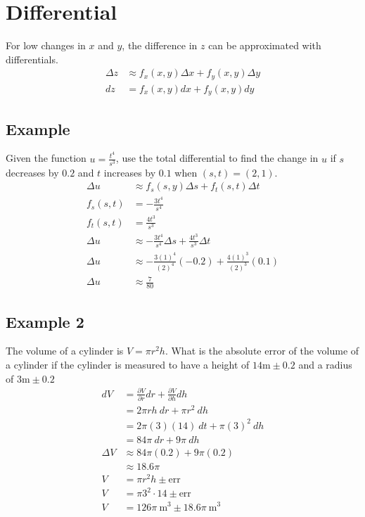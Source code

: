 \documentclass{article}
\theoremstyle{mytheoremstyle}
\theoremstyle{mytheoremstyle}
\theoremstyle{myproblemstyle}
\begin{document}
    \section*{Differential}
    For low changes in $x$ and $y$, the difference in $z$ can be approximated
    with differentials.
    \begin{align*}
        \Delta z &\approx f_x(x,y)\Delta x + f_y(x,y)\Delta y \\
        dz &= f_x(x,y)dx + f_y(x,y)dy
    \end{align*}

    \subsection*{Example}
    Given the function $u=\frac{t^4}{s^3}$, use the total differential to find
    the change in $u$ if $s$ decreases by $0.2$ and $t$ increases by $0.1$ when
    $(s,t)=(2,1)$.
    \begin{align*}
        \Delta u &\approx f_s(s,y) \Delta s + f_t(s,t) \Delta t \\
        f_s(s,t) &= -\frac{3t^4}{s^4} \\
        f_t(s,t) &= \frac{4t^3}{s^3} \\
        \Delta u &\approx -\frac{3t^4}{s^4} \Delta s + \frac{4t^3}{s^3} \Delta t \\
        \Delta u &\approx -\frac{3(1)^4}{(2)^4} (-0.2) + \frac{4(1)^3}{(2)^3} (0.1) \\
        \Delta u &\approx \frac{7}{80}
    \end{align*}

    \subsection*{Example 2}
    The volume of a cylinder is $V=\pi r^2h$. What is the absolute error of
    the volume of a cylinder if the cylinder is measured to have a height of
    $14\text{m}\pm0.2$ and a radius of $3\text{m}\pm0.2$
    \begin{align*}
        dV &= \frac{\partial V}{\partial r} dr + \frac{\partial V}{\partial h} dh \\
           &= 2\pi rh\ dr + \pi r^2\ dh \\
           &= 2\pi (3)(14)\ dt + \pi (3)^2\ dh \\
           &= 84 \pi\ dr + 9 \pi\ dh \\
        \Delta V &\approx 84 \pi (0.2) + 9 \pi (0.2) \\
                 &\approx 18.6 \pi \\
        V  &= \pi r^2h \pm \text{err} \\
        V  &= \pi 3^2\cdot 14 \pm \text{err} \\
        V  &= 126 \pi\ \text{m}^3\pm 18.6 \pi\ \text{m}^3
    \end{align*}
\end{document}
